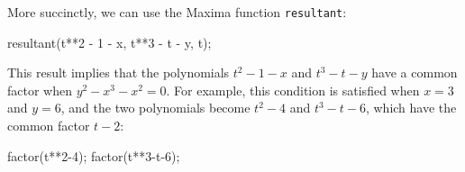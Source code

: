 More succinctly, we can use the Maxima function {\tt resultant}:

\begin{maximablock}
resultant(t**2 - 1 - x, t**3 - t - y, t);
\end{maximablock}

This result implies that the polynomials $t^2-1-x$ and $t^3-t-y$
have a common factor when $y^2-x^3-x^2=0$.  For example,
this condition is satisfied when $x=3$ and $y=6$, and
the two polynomials become $t^2-4$ and $t^3-t-6$, which
have the common factor $t-2$:

\begin{maximablock}
factor(t**2-4);
factor(t**3-t-6);
\end{maximablock}

\endexample


\vfill\eject

